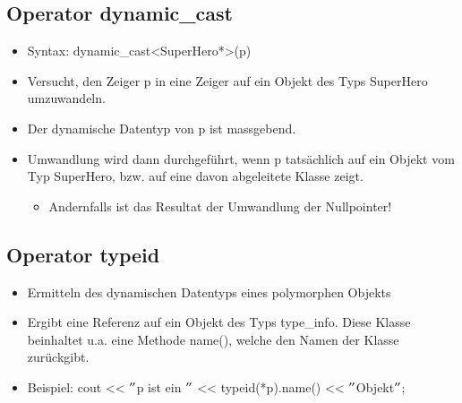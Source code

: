 \subsection{Operator dynamic\_cast}
\begin{itemize}
	\item Syntax: dynamic\_cast<SuperHero*>(p)
	\item Versucht, den Zeiger p in eine Zeiger auf ein Objekt des Typs SuperHero umzuwandeln.
	\item Der dynamische Datentyp von p ist massgebend.
	\item Umwandlung wird dann durchgeführt, wenn p tatsächlich auf ein Objekt vom Typ SuperHero, bzw. auf eine davon abgeleitete Klasse zeigt.
	\begin{itemize}
		\item Andernfalls ist das Resultat der Umwandlung der Nullpointer!
	\end{itemize}
\end{itemize}

\subsection{Operator typeid}
\begin{itemize}
	\item Ermitteln des dynamischen Datentyps eines polymorphen Objekts
	\item Ergibt eine Referenz auf ein Objekt des Typs type\_info. Diese Klasse beinhaltet u.a. eine Methode name(), welche den Namen der Klasse zurückgibt.
	\item Beispiel:
	\subitem cout << $"$p ist ein $"$ << typeid(*p).name() << $"$Objekt$"$;
\end{itemize}


